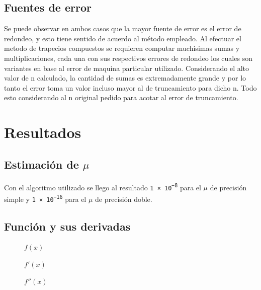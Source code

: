\documentclass[11pt,a4paper]{article}
\begin{document}
\subsection{Fuentes de error}

Se puede observar en ambos casos que la mayor fuente de error es el error de redondeo, y esto tiene sentido de acuerdo al método empleado. Al efectuar el metodo de trapecios compuestos se requieren computar muchisimas sumas y multiplicaciones, cada una con sus respectivos errores de redondeo los cuales son variantes en base al error de maquina particular utilizado. Considerando el alto valor de n calculado, la cantidad de sumas es extremadamente grande y por lo tanto el error toma un valor incluso mayor al de truncamiento para dicho n. Todo esto considerando al n original pedido para acotar al error de truncamiento.

\section{Resultados}

\subsection{Estimación de \( \mu \) }

Con el algoritmo utilizado se llego al resultado \texttt{\num{1e-8}} para el \(\mu\) de precisión simple y \texttt{\num{1e-16}} para el \(\mu\) de precisión doble.

\subsection{Función y sus derivadas}

\begin{figure}[H]
	\caption{\(f(x)\)}
	\label{fig:funcion}
\end{figure}

\begin{figure}[H]
	\caption{\(f'(x)\)}
	\label{fig:funcionderivada}
\end{figure}

\begin{figure}[H]
	\caption{\(f''(x)\)}
	\label{fig:funcionderivada2}
\end{figure}
\end{document}
